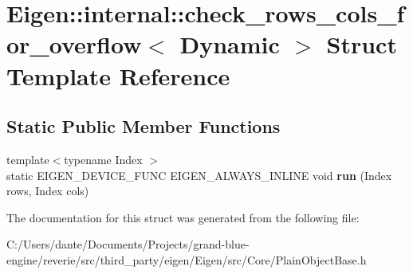 \hypertarget{struct_eigen_1_1internal_1_1check__rows__cols__for__overflow_3_01_dynamic_01_4}{}\section{Eigen\+::internal\+::check\+\_\+rows\+\_\+cols\+\_\+for\+\_\+overflow$<$ Dynamic $>$ Struct Template Reference}
\label{struct_eigen_1_1internal_1_1check__rows__cols__for__overflow_3_01_dynamic_01_4}
\subsection*{Static Public Member Functions}
\begin{DoxyCompactItemize}
\item 
\mbox{\label{struct_eigen_1_1internal_1_1check__rows__cols__for__overflow_3_01_dynamic_01_4_a4483c7d8313821530752f5639014bb58}} 
{\footnotesize template$<$typename Index $>$ }\\static E\+I\+G\+E\+N\+\_\+\+D\+E\+V\+I\+C\+E\+\_\+\+F\+U\+NC E\+I\+G\+E\+N\+\_\+\+A\+L\+W\+A\+Y\+S\+\_\+\+I\+N\+L\+I\+NE void {\bfseries run} (Index rows, Index cols)
\end{DoxyCompactItemize}


The documentation for this struct was generated from the following file\+:\begin{DoxyCompactItemize}
\item 
C\+:/\+Users/dante/\+Documents/\+Projects/grand-\/blue-\/engine/reverie/src/third\+\_\+party/eigen/\+Eigen/src/\+Core/Plain\+Object\+Base.\+h\end{DoxyCompactItemize}
